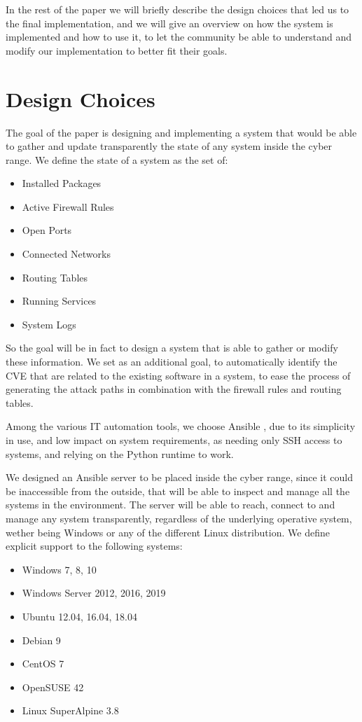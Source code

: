 \documentclass[11pt]{article}
\begin{document}
In the rest of the paper we will briefly describe the design choices that led us to the final implementation, and we will give an overview on how the system is implemented and how to use it, to let the community be able to understand and modify our implementation to better fit their goals. 

\section{Design Choices}

The goal of the paper is designing and implementing a system that would be able to gather and update transparently the state of any system inside the cyber range. We define the state of a system as the set of:

\begin{itemize}
\item Installed Packages 
\item Active Firewall Rules
\item Open Ports
\item Connected Networks
\item Routing Tables
\item Running Services
\item System Logs
\end{itemize}

So the goal will be in fact to design a system that is able to gather or modify these information. We set as an additional goal, to automatically identify the CVE that are related to the existing software in a system, to ease the process of generating the attack paths in combination with the firewall rules and routing tables. 

Among the various IT automation tools, we choose Ansible \cite{ansible}, due to its simplicity in use, and low impact on system requirements, as needing only SSH access to systems, and relying on the Python runtime to work. 

We designed an Ansible server to be placed inside the cyber range, since it could be inaccessible from the outside, that will be able to inspect and manage all the systems in the environment.  
The server will be able to reach, connect to and manage any system transparently, regardless of the underlying operative system, wether being Windows or any of the different Linux distribution.
We define explicit support to the following systems:

\begin{itemize}
\item Windows 7, 8, 10
\item Windows Server 2012, 2016, 2019
\item Ubuntu 12.04, 16.04, 18.04
\item Debian 9
\item CentOS 7
\item OpenSUSE 42
\item Linux SuperAlpine 3.8
\end{itemize}
\end{document}
